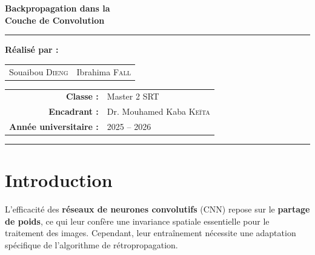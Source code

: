 \documentclass[12pt, a4paper]{article}
\begin{document}
\begin{titlepage}
    \vspace{0.3cm}

    {\LARGE\bfseries\color{espblue}
        Backpropagation dans la\\[5pt]
        Couche de Convolution
    }

    \vspace{0.3cm}
    {\color{espgold}\rule{0.8\linewidth}{1.5pt}}
    \vspace{0.5cm}

    \Large\bfseries Réalisé par :\\[0.4cm]
    \begin{tabular}{cc}
        \Large\color{espblue} Souaibou \textsc{Dieng} &
        \Large\color{espblue} Ibrahima \textsc{Fall} \\
    \end{tabular}

    \vfill

    \begin{tabular}{rl}
        \textbf{Classe :}              & Master 2 SRT \\[3pt]
        \textbf{Encadrant :}           & Dr. Mouhamed Kaba \textsc{Keïta} \\[3pt]
        \textbf{Année universitaire :} & 2025 -- 2026 \\
    \end{tabular}

    \vspace{0.4cm}
    {\color{espblue}\rule{\linewidth}{3pt}}
\end{titlepage}

\tableofcontents
\thispagestyle{fancy}
\newpage

\section*{Introduction}

L'efficacité des \textbf{réseaux de neurones convolutifs} (CNN) repose sur le
\textbf{partage de poids}, ce qui leur confère une invariance spatiale essentielle pour
le traitement des images. Cependant, leur entraînement nécessite une adaptation
spécifique de l'algorithme de rétropropagation.
\end{document}
